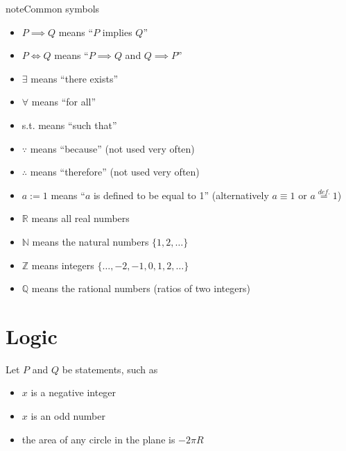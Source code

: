 \documentclass[letterpaper,10pt,english]{jupyterBook}
\begin{document}
\begin{sphinxadmonition}{note}{Common symbols}
\begin{itemize}
\item {} 
\sphinxAtStartPar
\(P \implies Q\) means “\(P\) implies \(Q\)”

\item {} 
\sphinxAtStartPar
\(P \iff Q\) means “\(P \implies Q\) and \(Q \implies P\)”

\item {} 
\sphinxAtStartPar
\(\exists\) means “there exists”

\item {} 
\sphinxAtStartPar
\(\forall\) means “for all”

\item {} 
\sphinxAtStartPar
s.t. means “such that”

\item {} 
\sphinxAtStartPar
\(\because\) means “because” (not used very often)

\item {} 
\sphinxAtStartPar
\(\therefore\) means “therefore” (not used very often)

\item {} 
\sphinxAtStartPar
\(a := 1\) means “\(a\) is defined to be equal to 1” (alternatively \(a \equiv 1\) or \(a \stackrel{def.}{=} 1 \))

\item {} 
\sphinxAtStartPar
\(\mathbb{R}\) means all real numbers

\item {} 
\sphinxAtStartPar
\(\mathbb{N}\) means the natural numbers \(\{1, 2, \ldots \}\)

\item {} 
\sphinxAtStartPar
\(\mathbb{Z}\) means integers \(\{\ldots, -2,-1,0,1, 2, \ldots \}\)

\item {} 
\sphinxAtStartPar
\(\mathbb{Q}\) means the rational numbers (ratios of two integers)

\end{itemize}
\end{sphinxadmonition}


\section{Logic}
\label{\detokenize{03.set_theory:logic}}
\sphinxAtStartPar
Let \(P\) and \(Q\) be statements, such as
\begin{itemize}
\item {} 
\sphinxAtStartPar
\(x\) is a negative integer

\item {} 
\sphinxAtStartPar
\(x\) is an odd number

\item {} 
\sphinxAtStartPar
the area of any circle in the plane is \(-2 \pi R\)

\end{itemize}
\end{document}
